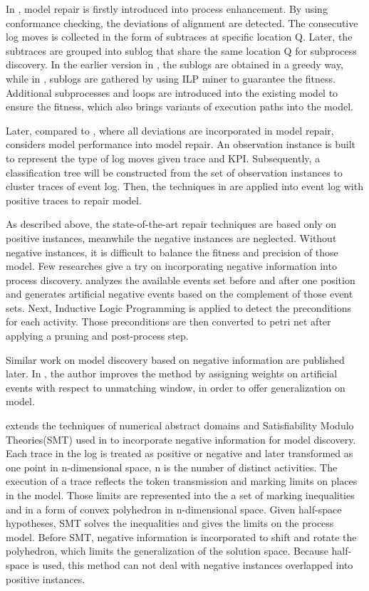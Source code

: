 In \cite{fahland2012repairing}, model repair is firstly introduced into process enhancement. By using conformance checking, the deviations of alignment are detected. The consecutive log moves is collected in the form of subtraces at specific location Q. Later, the subtraces are grouped into sublog that share the same location Q for subprocess discovery. In the earlier version in \cite{fahland2012repairing}, the sublogs are obtained in a greedy way, while in \cite{fahland2015model}, sublogs are gathered by using ILP miner to guarantee the fitness. Additional subprocesses and loops are introduced into the existing model to ensure the fitness, which also brings variants of execution paths into the model. 

Later, compared to \cite{fahland2012repairing, fahland2015model}, where all deviations are incorporated in model repair, \cite{dees2017enhancing} considers model performance into model repair. An observation instance is built to represent the type of log moves given trace and  KPI. Subsequently, a classification tree will be constructed from the set of observation instances to cluster traces of event log. Then, the techniques in \cite{fahland2015model} are applied into event log with positive traces to repair model. 


As described above, the state-of-the-art repair techniques are based only on positive instances, meanwhile the negative instances are neglected. Without negative instances, it is difficult to balance the fitness and precision of those model. Few researches give a try on incorporating negative information into process discovery. \cite{goedertier2009robust}  analyzes the available events set before and after one position and generates artificial negative events based on the complement of those event sets. Next, Inductive Logic Programming is applied to detect the preconditions for each activity. Those preconditions are then converted to petri net after applying a pruning and post-process step. 

Similar work on model discovery based on negative information are published later. In \cite{vanden2014determining}, the author improves the method by assigning weights on artificial events with respect to unmatching window, in order to offer generalization on model. 

\cite{ponce2016incorporating} extends the techniques of numerical abstract domains and Satisfiability Modulo Theories(SMT) used in \cite{carmona2014process} to incorporate negative information for model discovery. Each trace in the log is treated as positive or negative and later transformed as one point in n-dimensional space, n is the number of distinct activities. The execution of a trace reflects the token transmission and marking limits on places in the model. Those limits are represented into the a set of marking inequalities and in a form of convex polyhedron in n-dimensional space. Given half-space hypotheses, SMT solves the inequalities and gives the limits on the process model. Before SMT, negative information is incorporated to shift and rotate the polyhedron, which limits the generalization of the solution space. Because half-space is used, this method can not deal with negative instances overlapped into positive instances.

